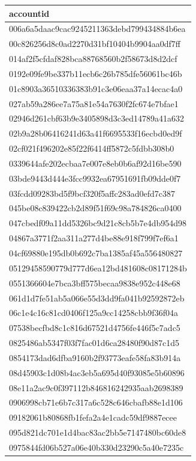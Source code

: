 \begin{tabular}{l}
\toprule
accountid \\
\midrule
006a6a5daac9cac9245211363debd799434884b6ea \\
00c826256d8c0ad2270d31bf10404b9904aa0df7ff \\
014af2f5cfdaf828bca88768560b2f58673d8d2dcf \\
0192e09fe9be337b11ecb6c26b785dfe56061bc46b \\
01c8903a36510336383b91c3e06eaa37a14ecac4a0 \\
027ab59a286ee7a75a81e54a7630f2fc674e7bfae1 \\
02946d261cbf63b9e3405898d3c3ed14789a41a632 \\
02b9a28b06416241d63a41f6695533f16ecbd0ed9f \\
02cf021f496202e85f22f6414ff5872c5fdbb308b0 \\
0339644afe202ecbaa7e007e8eb0b6af92d16be590 \\
03bde9443d444e3fcc9932ea67951691fb09dde0f7 \\
03fcdd09283bd5f9bcf320f5affc283ad0efd7c387 \\
045be08c839422cb2d89f51f69c98a784826ca0400 \\
047cbedf09a11dd5326bc9d21c8cb5b7e4db954d98 \\
04867a3771f2aa311a277d4be88e918f799f7ef6a1 \\
04cf69880e195db0b692c7ba1385af45a556480827 \\
05129458590779d777d6ea12bd481608c08171284b \\
0551366604e7bca3bff575becaa9838e952c448e68 \\
061d1d7fe51ab5a066e55d3dd9fa041b92592872eb \\
06c1e4c16c81cd0406f125a9cc14258cbb9f36f04a \\
07538becfbd8c1c816d67521d4756fe446f5c7adc5 \\
0825486ab5347f03f7fac01d6ca28480f90d87c1d5 \\
0854173dad6dfba9160b2f93773eafe58fa83b914a \\
08d45903c1d08b4ac3eb5a695d40f93085e5b60896 \\
08e11a2ac9c0f397112b846816242935aab2698389 \\
0906998cb71e6b7c317a6c528c646cbafb88e1d106 \\
09182061b80868fb1fefa2a4e1cadc59df9887ecee \\
095d821dc701e1d4bac83ac2bb5e7147480bc60de8 \\
0975844fd06b527a06e40b330d23290c5a40e7235c \\

\end{tabular}
